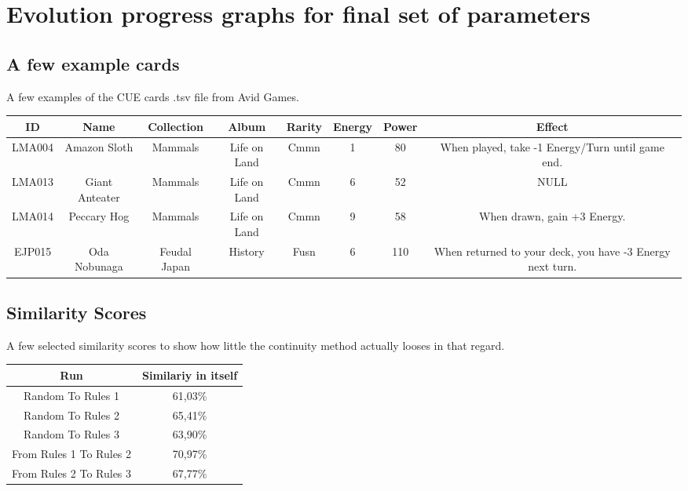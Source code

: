 \chapter{Evolution progress graphs for final set of parameters}
\label{appendix_evolution}

\section{A few example cards}
\label{app:cue_cards_ex}%
A few examples of the CUE cards .tsv file from Avid Games.

\begin{tabular}{|c|c|c|c|c|c|c|c|}
	\rule[-1ex]{0pt}{1.65ex} ID & Name & Collection & Album & Rarity & Energy & Power & Effect \\%
	\hline%
	\hline%
	\rule[-1ex]{0pt}{2.5ex} LMA004 & Amazon Sloth & Mammals & Life on Land & Cmmn & 1 & 80 & When played, take -1 Energy/Turn until game end. \\%
	\hline%
	\rule[-1ex]{0pt}{2.5ex} LMA013 & Giant Anteater & Mammals & Life on Land & Cmmn & 6 & 52 & NULL \\%
	\hline%
	\rule[-1ex]{0pt}{2.5ex} LMA014 & Peccary Hog & Mammals & Life on Land & Cmmn & 9 & 58 & When drawn, gain +3 Energy. \\%
	\hline%
	\rule[-1ex]{0pt}{2.5ex} EJP015 & Oda Nobunaga & Feudal Japan & History & Fusn & 6 & 110 & When returned to your deck, you have -3 Energy next turn. \\%
	\hline%
\end{tabular}

\section{Similarity Scores}
\label{similarity_scores}
A few selected similarity scores to show how little the continuity method actually looses in that regard.\\
\begin{tabular}{|c|c|}
	\hline
	Run & Similariy in itself \\
	\hline
	Random To Rules 1 & 61,03\% \\
	\hline
	Random To Rules 2 & 65,41\% \\
	\hline
	Random To Rules 3 & 63,90\% \\
	\hline
	From Rules 1 To Rules 2 & 70,97\% \\
	\hline
	From Rules 2 To Rules 3 & 67,77\% \\
	\hline
\end{tabular}\\


